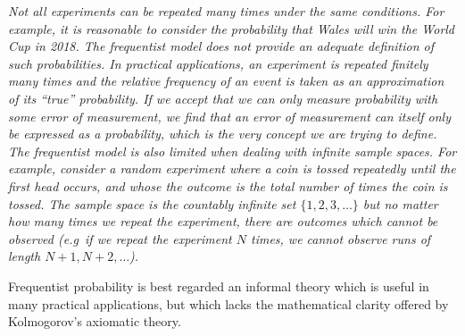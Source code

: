 \bit
\it 
Not all experiments can be repeated many times under the same conditions. For example, it is reasonable to consider the probability that Wales will win the World Cup in 2018. The frequentist model does not provide an adequate definition of such probabilities.
\it 
In practical applications, an experiment is repeated finitely many times and the relative frequency of an event is taken as an approximation of its ``true'' probability. If we accept that we can only measure probability with some error of measurement, we find that an error of measurement can itself only be expressed as a probability, which is the very concept we are trying to define. 
\it
The frequentist model is also limited when dealing with infinite sample spaces. For example, consider a random experiment where a coin is tossed repeatedly until the first head occurs, and whose the outcome is the total number of times the coin is tossed. The sample space is the countably infinite set $\{1,2,3,\ldots\}$ but no matter how many times we repeat the experiment, there are outcomes which cannot be observed (e.g\ if we repeat the experiment $N$ times, we cannot observe runs of length $N+1, N+2,\ldots$).
\eit

Frequentist probability is best regarded an informal theory which is useful in many practical applications, but which lacks the mathematical clarity offered by Kolmogorov's axiomatic theory.



